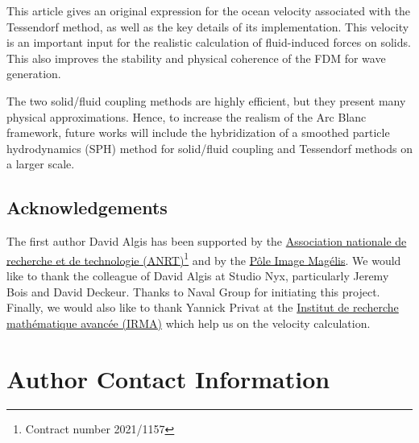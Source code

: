 \documentclass[final]{jcgt}
\def\framework{the Arc Blanc framework\xspace}
\begin{document}
This article gives an original expression for the ocean velocity associated with the Tessendorf method, as well as the key details of its implementation. This velocity is an important input for the realistic calculation of fluid-induced forces on solids.
This also improves the stability and physical coherence of the FDM for wave generation.

The two solid/fluid coupling methods are highly efficient, but they present many physical approximations.
Hence, to increase the realism of \framework, future works will include the hybridization of a smoothed particle hydrodynamics (SPH) method for solid/fluid coupling and Tessendorf methods on a larger scale. %

\subsection*{Acknowledgements}
The first author David Algis has been supported by the \href{https://www.anrt.asso.fr/fr}{Association nationale de recherche et de technologie (ANRT)}\footnote{Contract number 2021/1157} and by the \href{https://www.magelis.org/}{Pôle Image Magélis}. We would like to thank the colleague of David Algis at Studio Nyx, particularly Jeremy Bois and David Deckeur. Thanks to Naval Group for initiating this project. Finally, we would also like to thank Yannick Privat at the \href{https://irma.math.unistra.fr/}{Institut de recherche mathématique avancée (IRMA)} which help us on the velocity calculation.




\small




\section*{Author Contact Information}
\end{document}
